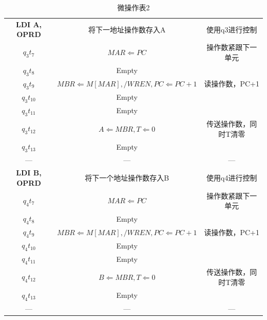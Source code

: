 \documentclass[UTF8]{ctexart}
\begin{document}
    \begin{table}[!htb]
        \centering
        \begin{tabular}{|c|c|c|}
        \hline
        \textbf{LDI A, OPRD }& 将下一地址操作数存入A  & 使用q3进行控制\\
        $q_3t_7$ & $MAR \Leftarrow PC $& 操作数紧跟下一单元\\
        $q_3t_8$ & Empty &  \\
        $q_3t_9$ &$ MBR \Leftarrow M[MAR], /WREN, PC \Leftarrow PC + 1 $& 读操作数，PC+1 \\
        $q_3t_{10}$ & Empty &  \\
        $q_3t_{11}$ & Empty &  \\
        $q_3t_12$ & $A \Leftarrow MBR, T \Leftarrow 0$ & 传送操作数，同时T清零\\
        $q_3t_{13}$ & Empty &  \\
        ---&---&---\\
        \hline
        \textbf{LDI B, OPRD} & 将下一个地址操作数存入B  & 使用q4进行控制 \\
        $q_4t_7$ &$ MAR \Leftarrow PC$ & 操作数紧跟下一单元\\
        $q_4t_8$ & Empty &  \\
        $q_4t_9$ &$ MBR \Leftarrow M[MAR], /WREN, PC \Leftarrow PC + 1$ & 读操作数，PC+1 \\
        $q_4t_{10}$ & Empty &  \\
        $q_4t_{11}$ & Empty &  \\
        $q_4t_12$ & $B \Leftarrow MBR, T \Leftarrow 0 $& 传送操作数，同时T清零\\
        $q_4t_{13}$ & Empty &  \\
        ---&---&---\\
        \hline
        \hline
        \end{tabular}
    \caption{微操作表2}\label{微操作表2}
    \end{table}
    \newpage
\end{document}
